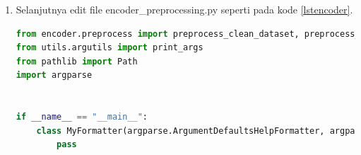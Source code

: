 \begin{enumerate}
\begin{lstlisting}[language=Python, caption=Preprocessing Function]
#sama dengan diatas.
#catatan: jika teman-teman hanya menggunakan satu dataset maka hapus function ini, abaikan, atau komen.
#jika menggunakan tiga dataset maka tambahkan function ini dan sesuaikan dengan dataset teman-teman seperti cara di atas.

def preprocess_speech_dataset(datasets_root: Path, out_dir: Path, skip_existing=False):
    for dataset_name in titml_datasets["train"]["clean"]:
        # Initialize the preprocessing
        dataset_root, logger = _init_preprocess_dataset(dataset_name, datasets_root, out_dir)
        if not dataset_root:
            return

            # Preprocess all speakers
        speaker_dirs = list(dataset_root.glob("*"))
        _preprocess_speaker_dirs(speaker_dirs, dataset_name, datasets_root, out_dir, "wav",
                                 skip_existing, logger)
\end{lstlisting}

\item Selanjutnya edit file encoder\_preprocessing.py seperti pada kode \ref{lstencoder}.

\begin{lstlisting}[language=Python, caption=Preprocessing Encoder Model, label=lstencoder]
from encoder.preprocess import preprocess_clean_dataset, preprocess_speech_dataset
from utils.argutils import print_args
from pathlib import Path
import argparse


if __name__ == "__main__":
    class MyFormatter(argparse.ArgumentDefaultsHelpFormatter, argparse.RawDescriptionHelpFormatter):
        pass


\end{lstlisting}
\end{enumerate}
